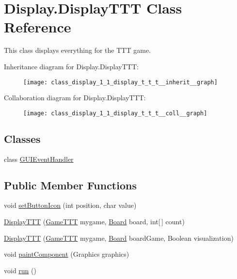 \hypertarget{class_display_1_1_display_t_t_t}{}\section{Display.\+Display\+T\+T\+T Class Reference}
\label{class_display_1_1_display_t_t_t}


This class displays everything for the T\+T\+T game.  




Inheritance diagram for Display.\+Display\+T\+T\+T\+:
\nopagebreak
\begin{figure}[H]
\begin{center}
\leavevmode
\texttt{[image: class\_display\_1\_1\_display\_t\_t\_t\_\_inherit\_\_graph]}
\end{center}
\end{figure}


Collaboration diagram for Display.\+Display\+T\+T\+T\+:
\nopagebreak
\begin{figure}[H]
\begin{center}
\leavevmode
\texttt{[image: class\_display\_1\_1\_display\_t\_t\_t\_\_coll\_\_graph]}
\end{center}
\end{figure}
\subsection*{Classes}
\begin{DoxyCompactItemize}
\item 
class \hyperlink{class_display_1_1_display_t_t_t_1_1_g_u_i_event_handler}{G\+U\+I\+Event\+Handler}
\end{DoxyCompactItemize}
\subsection*{Public Member Functions}
\begin{DoxyCompactItemize}
\item 
void \hyperlink{class_display_1_1_display_t_t_t_a8e33c12c8d44efe24ad731221329fc85}{set\+Button\+Icon} (int position, char value)
\item 
\hyperlink{class_display_1_1_display_t_t_t_a2c3b14ea1ac44f89006718c20e00b612}{Display\+T\+T\+T} (\hyperlink{class_game_1_1_game_t_t_t}{Game\+T\+T\+T} mygame, \hyperlink{class_board_1_1_board}{Board} board, int\mbox{[}$\,$\mbox{]} count)
\item 
\hyperlink{class_display_1_1_display_t_t_t_a3ccc11c3b13311bc0ae2ce71a2b2dec4}{Display\+T\+T\+T} (\hyperlink{class_game_1_1_game_t_t_t}{Game\+T\+T\+T} mygame, \hyperlink{class_board_1_1_board}{Board} board\+Game, Boolean visualization)
\item 
void \hyperlink{class_display_1_1_display_t_t_t_a6ec07c14b618df7f4c10037ee12d3685}{paint\+Component} (Graphics graphics)
\item 
void \hyperlink{class_display_1_1_display_t_t_t_a3b66c11e8632e24ba72e1f36f3c2307a}{run} ()
\end{DoxyCompactItemize}
